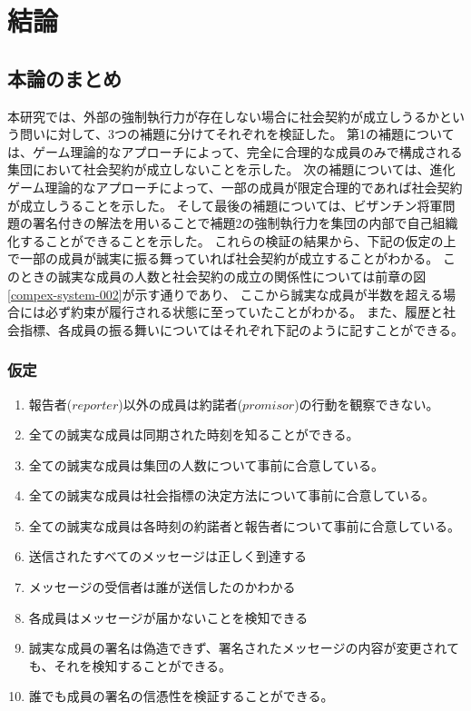 \chapter{結論}
\section{本論のまとめ}
本研究では、外部の強制執行力が存在しない場合に社会契約が成立しうるかという問いに対して、3つの補題に分けてそれぞれを検証した。
第1の補題については、ゲーム理論的なアプローチによって、完全に合理的な成員のみで構成される集団において社会契約が成立しないことを示した。
次の補題については、進化ゲーム理論的なアプローチによって、一部の成員が限定合理的であれば社会契約が成立しうることを示した。
そして最後の補題については、ビザンチン将軍問題の署名付きの解法を用いることで補題2の強制執行力を集団の内部で自己組織化することができることを示した。
これらの検証の結果から、下記の仮定の上で一部の成員が誠実に振る舞っていれば社会契約が成立することがわかる。
このときの誠実な成員の人数と社会契約の成立の関係性については前章の図\ref{compex-system-002}が示す通りであり、
ここから誠実な成員が半数を超える場合には必ず約束が履行される状態に至っていたことがわかる。
また、履歴と社会指標、各成員の振る舞いについてはそれぞれ下記のように記すことができる。

\subsection{仮定}
\begin{enumerate}
  \item 報告者($reporter$)以外の成員は約諾者($promisor$)の行動を観察できない。  
  \item 全ての誠実な成員は同期された時刻を知ることができる。 
  \item 全ての誠実な成員は集団の人数について事前に合意している。
  \item 全ての誠実な成員は社会指標の決定方法について事前に合意している。
  \item 全ての誠実な成員は各時刻の約諾者と報告者について事前に合意している。
  \item 送信されたすべてのメッセージは正しく到達する
  \item メッセージの受信者は誰が送信したのかわかる
  \item 各成員はメッセージが届かないことを検知できる
  \item 誠実な成員の署名は偽造できず、署名されたメッセージの内容が変更されても、それを検知することができる。
  \item 誰でも成員の署名の信憑性を検証することができる。
\end{enumerate}

